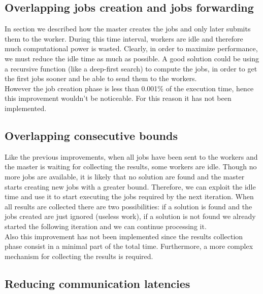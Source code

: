 \documentclass{article}
\begin{document}
\subsection{Overlapping jobs creation and jobs forwarding}
In section  we described how the master creates the jobs and only later submits them to the worker. During this time interval, workers are idle and therefore much computational power is wasted. Clearly, in order to maximize performance, we must reduce the idle time as much as possible. A good solution could be using a recursive function (like a deep-first search) to compute the jobs, in order to get the first jobs sooner and be able to send them to the workers. \\
However the job creation phase is less than 0.001\% of the execution time, hence this improvement wouldn't be noticeable. For this reason it has not been implemented.


\subsection{Overlapping consecutive bounds}
Like the previous improvements, when all jobs have been sent to the workers and the master is waiting for collecting the results, some workers are idle. Though no more jobs are available, it is likely that no solution are found and the master starts creating new jobs with a greater bound. Therefore, we can exploit the idle time and use it to start executing the jobs required by the next iteration. When all results are collected there are two possibilities: if a solution is found and the jobs created are just ignored (useless work), if a solution is not found we already started the following iteration and we can continue processing it. \\
Also this improvement has not been implemented since the results collection phase consist in a minimal part of the total time. Furthermore, a more complex mechanism for collecting the results is required.


\subsection{Reducing communication latencies}
\end{document}
